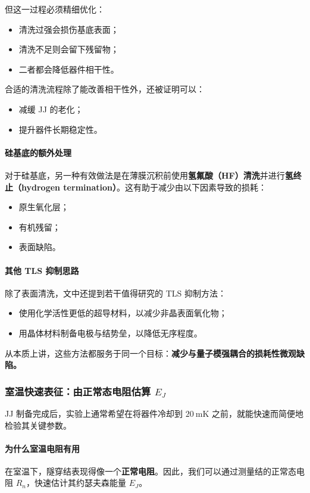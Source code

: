 \documentclass[12pt,a4paper,oneside]{ctexbook}
\begin{document}
但这一过程必须精细优化：
\begin{itemize}
    \item 清洗过强会损伤基底表面；
    \item 清洗不足则会留下残留物；
    \item 二者都会降低器件相干性。
\end{itemize}

合适的清洗流程除了能改善相干性外，还被证明可以：
\begin{itemize}
    \item 减缓 JJ 的老化；
    \item 提升器件长期稳定性。
\end{itemize}

\paragraph{硅基底的额外处理}
对于硅基底，另一种有效做法是在薄膜沉积前使用\textbf{氢氟酸（HF）清洗}并进行\textbf{氢终止（hydrogen termination）}。这有助于减少由以下因素导致的损耗：
\begin{itemize}
    \item 原生氧化层；
    \item 有机残留；
    \item 表面缺陷。
\end{itemize}

\paragraph{其他 TLS 抑制思路}
除了表面清洗，文中还提到若干值得研究的 TLS 抑制方法：
\begin{itemize}
    \item 使用化学活性更低的超导材料，以减少非晶表面氧化物；
    \item 用晶体材料制备电极与结势垒，以降低无序程度。
\end{itemize}

从本质上讲，这些方法都服务于同一个目标：\textbf{减少与量子模强耦合的损耗性微观缺陷。}

\subsubsection{室温快速表征：由正常态电阻估算 \(E_J\)}

JJ 制备完成后，实验上通常希望在将器件冷却到 \(20~\mathrm{mK}\) 之前，就能快速而简便地检验其关键参数。

\paragraph{为什么室温电阻有用}
在室温下，隧穿结表现得像一个\textbf{正常电阻}。因此，我们可以通过测量结的正常态电阻 \(R_n\)，快速估计其约瑟夫森能量 \(E_J\)。
\end{document}
